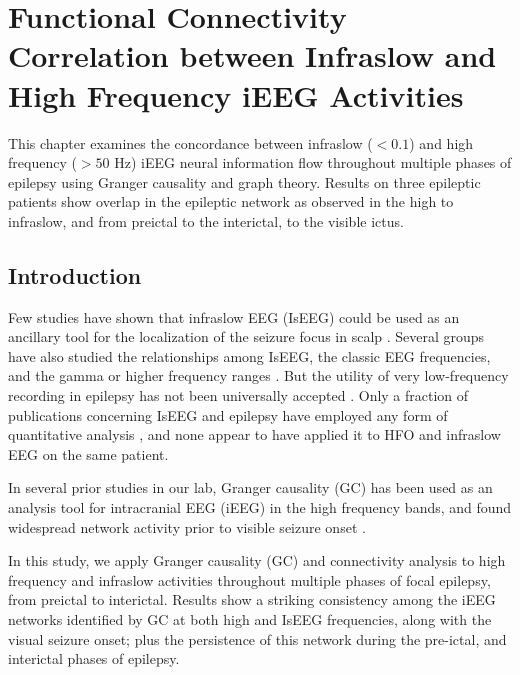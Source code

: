 
\chapter{Functional Connectivity Correlation between Infraslow and High Frequency iEEG Activities}
\label{chapter:ieeg-infraslow-hfo-correlation}

This chapter examines the concordance between infraslow ($<0.1$) and high frequency ($>50$ Hz) iEEG neural information flow throughout multiple phases of epilepsy using Granger causality and graph theory. Results on three epileptic patients show overlap in the epileptic network as observed in the high to infraslow, and from preictal to the interictal, to the visible ictus.

\section{Introduction}

Few studies have shown that infraslow EEG (IsEEG) could be used as an ancillary tool for the localization of the seizure focus in scalp 
\citep{leistner2007combined, miller2007ictal, murai2020scalp}.
Several groups have also studied the relationships among IsEEG, the classic EEG frequencies, and the gamma or higher frequency ranges 
\citep{modur2012seizure, wu2014role, thompson2016interictal, inoue2019interictal}. But the utility of very low-frequency recording in epilepsy has not been universally accepted \citep{gross1999intracranial}. Only a fraction of publications concerning IsEEG and epilepsy have employed any form of quantitative analysis \citep{modur2012seizure, thompson2016interictal, thompson2016ictal, murai2020scalp}, and none appear to have applied it to HFO and infraslow EEG on the same patient.

In several prior studies in our lab, Granger causality (GC) \citep{granger1969investigating} has been used as an analysis tool for intracranial EEG (iEEG) in the high frequency bands, and found widespread network activity prior to visible seizure onset \citep{adhikari2013localizing, epstein2014application}. 

In this study, we apply Granger causality (GC) and connectivity analysis to high frequency and infraslow activities throughout multiple phases of focal epilepsy, from preictal to interictal. Results show a striking consistency among the iEEG networks identified by GC at both high and IsEEG frequencies, along with the visual seizure onset; plus the persistence of this network during the pre-ictal, and interictal phases of epilepsy.  

